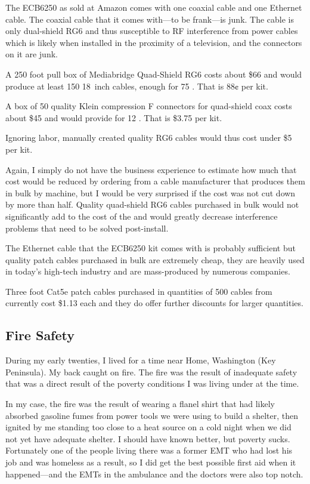 The ECB6250 as sold at Amazon comes with one coaxial cable and one Ethernet cable. The coaxial
cable that it comes with---to be frank---is junk. The cable is only dual-shield RG6 and thus susceptible
to RF interference from power cables which is likely when installed in the proximity of a television,
and the connectors on it are junk.

A 250 foot pull box of Mediabridge Quad-Shield RG6 costs about \$66 and would produce at least 150
\SI{18}{inch} cables, enough for 75 . That is 88¢ per kit.

A box of 50 quality Klein compression F connectors for quad-shield coax costs about \$45 and would
provide for 12 . That is \$3.75 per kit.

Ignoring labor, manually created quality RG6 cables would thus cost under \$5 per kit.

Again, I simply do not have the business experience to estimate how much that cost would be reduced
by ordering from a cable manufacturer that produces them in bulk by machine, but I would be very
surprised if the cost was not cut down by more than half. Quality quad-shield RG6 cables purchased in bulk
would not significantly add to the cost of the  and would greatly decrease
interference problems that need to be solved post-install.

The Ethernet cable that the ECB6250 kit comes with is probably sufficient but quality patch cables
purchased in bulk are extremely cheap, they are heavily used in today's high-tech industry and are
mass-produced by numerous companies.

Three foot Cat5e patch cables purchased in quantities of 500 cables from
 currently cost \$1.13 each and they do offer further
discounts for larger quantities.

\subsection{Fire Safety}

During my early twenties, I lived for a time near Home, Washington (Key Peninsula). My back caught
on fire. The fire was the result of inadequate safety that was a direct result of the poverty conditions
I was living under at the time.

In my case, the fire was the result of wearing a flanel shirt that had likely absorbed gasoline fumes from
power tools we were using to build a shelter, then ignited by me standing too close to a heat source on a
cold night when we did not yet have adequate shelter. I should have known better, but poverty sucks.
Fortunately one of the people living there was a former EMT who had lost his job and was homeless as a
result, so I did get the best possible first aid when it happened---and the EMTs in the ambulance and the
doctors were also top notch.

